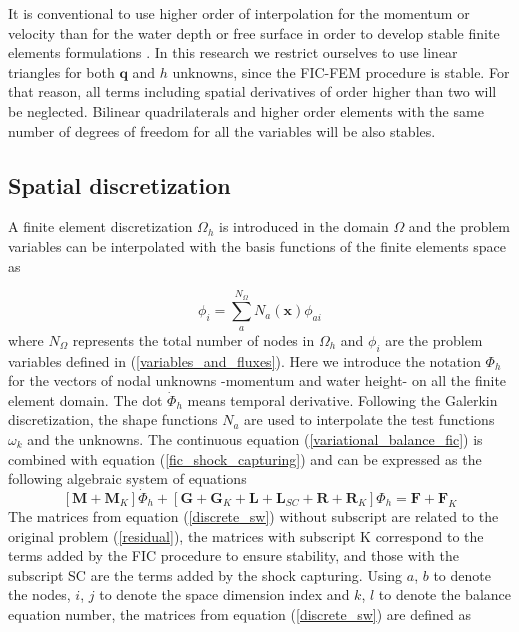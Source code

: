 \documentclass[a4paper,12pt]{article}
\begin{document}
It is conventional to use higher order of interpolation for the momentum or velocity than for the water depth or free surface in order to develop stable finite elements formulations \cite{hood1974,heniche2000,bercovier1979}. In this research we restrict ourselves to use linear triangles for both $\mathbf{q}$ and $h$ unknowns, since the FIC-FEM procedure is stable. For that reason, all terms including spatial derivatives of order higher than two will be neglected. Bilinear quadrilaterals and higher order elements with the same number of degrees of freedom for all the variables will be also stables.

\subsection{Spatial discretization}

A finite element discretization $\Omega_h$ is introduced in the domain $\Omega$ and the problem variables can be interpolated with the basis functions of the finite elements space as

\begin{equation}
\phi_i = \sum_a^{N_\Omega} N_a(\mathbf{x})\phi_{ai}
\end{equation}
where $N_\Omega$ represents the total number of nodes in $\Omega_h$ and $\phi_i$ are the problem variables defined in (\ref{variables_and_fluxes}). Here we introduce the notation $\Phi_h$ for the vectors of nodal unknowns -momentum and water height- on all the finite element domain. The dot $\dot\Phi_h$ means temporal derivative. Following the Galerkin discretization, the shape functions $N_a$ are used to interpolate the test functions $\omega_k$ and the unknowns. The continuous equation (\ref{variational_balance_fic}) is combined with equation (\ref{fic_shock_capturing}) and can be expressed as the following algebraic system of equations
\begin{equation} \label{discrete_sw}
[\mathbf{M} + \mathbf{M}_K] \dot{\Phi}_h
+ [\mathbf{G} + \mathbf{G}_K + \mathbf{L} + \mathbf{L}_{SC} + \mathbf{R} + \mathbf{R}_K] \Phi_h
= \mathbf{F} + \mathbf{F}_K
\end{equation}
The matrices from equation (\ref{discrete_sw}) without subscript are related to the original problem (\ref{residual}), the matrices with subscript K correspond to the terms added by the FIC procedure to ensure stability, and those with the subscript SC are the terms added by the shock capturing. Using $a$, $b$ to denote the nodes, $i$, $j$ to denote the space dimension index and $k$, $l$ to denote the balance equation number, the matrices from equation (\ref{discrete_sw}) are defined as
\end{document}
